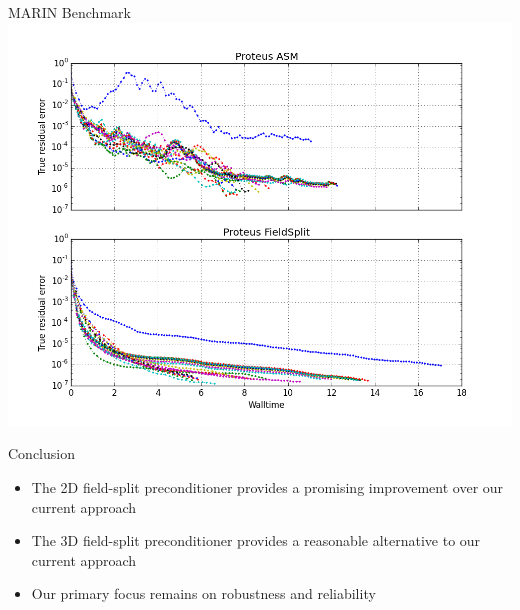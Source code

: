\documentclass{beamer}
\begin{document}
\begin{frame}{MARIN Benchmark}
    \includegraphics[width=\textwidth]{figures/marin_comparison.png}
\end{frame}

\begin{frame}{Conclusion}
  \begin{itemize}
  \item The 2D field-split preconditioner provides a promising improvement over
    our current approach
  \item The 3D field-split preconditioner provides a reasonable
    alternative to our current approach
  \item Our primary focus remains on robustness and reliability
  \end{itemize}
\end{frame}
\end{document}
